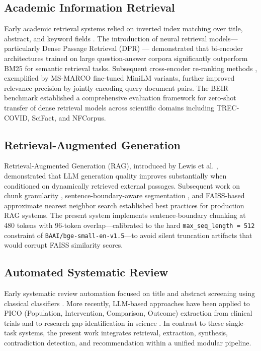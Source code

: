 \documentclass[conference]{IEEEtran}
\begin{document}
\subsection{Academic Information Retrieval}

Early academic retrieval systems relied on inverted index matching over
title, abstract, and keyword fields \cite{b1}. The introduction of neural
retrieval models---particularly Dense Passage Retrieval (DPR) \cite{b2}---
demonstrated that bi-encoder architectures trained on large
question-answer corpora significantly outperform BM25 for semantic retrieval
tasks. Subsequent cross-encoder re-ranking methods \cite{b3}, exemplified by
MS-MARCO fine-tuned MiniLM variants, further improved relevance precision by
jointly encoding query-document pairs. The BEIR benchmark \cite{b4}
established a comprehensive evaluation framework for zero-shot transfer of
dense retrieval models across scientific domains including TREC-COVID,
SciFact, and NFCorpus.

\subsection{Retrieval-Augmented Generation}

Retrieval-Augmented Generation (RAG), introduced by Lewis et al. \cite{b5},
demonstrated that LLM generation quality improves substantially when
conditioned on dynamically retrieved external passages. Subsequent work
on chunk granularity \cite{b6}, sentence-boundary-aware segmentation \cite{b7},
and FAISS-based approximate nearest neighbor search \cite{b8} established
best practices for production RAG systems. The present system implements
sentence-boundary chunking at 480 tokens with 96-token overlap---calibrated
to the hard \texttt{max\_seq\_length = 512} constraint of
\texttt{BAAI/bge-small-en-v1.5}---to avoid silent truncation artifacts that
would corrupt FAISS similarity scores.

\subsection{Automated Systematic Review}

Early systematic review automation focused on title and abstract screening
using classical classifiers \cite{b9}. More recently, LLM-based approaches
have been applied to PICO (Population, Intervention, Comparison, Outcome)
extraction from clinical trials \cite{b10} and to research gap identification
in science \cite{b11}. In contrast to these single-task systems, the present
work integrates retrieval, extraction, synthesis, contradiction detection,
and recommendation within a unified modular pipeline.
\end{document}
